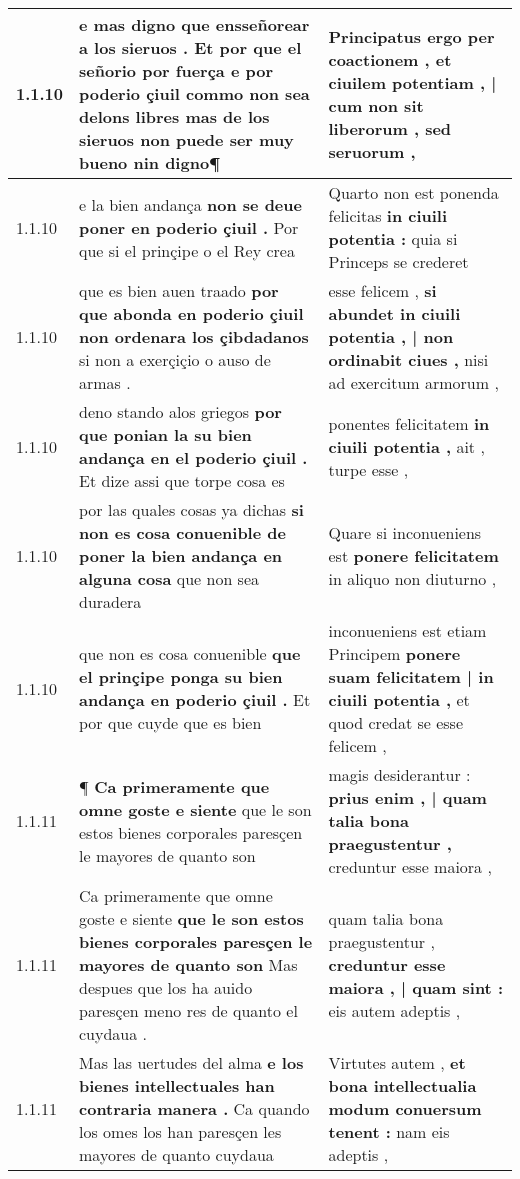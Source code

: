 \begin{tabular}{|p{1cm}|p{6.5cm}|p{6.5cm}|}
1.1.10 & e mas digno que ensseñorear a los sieruos . \textbf{ Et por que el señorio por fuerça e por poderio çiuil commo non sea delons libres } mas de los sieruos non puede ser muy bueno nin digno¶ & Principatus ergo per coactionem , \textbf{ et ciuilem potentiam , | cum non sit liberorum , } sed seruorum , \\\hline
1.1.10 & e la bien andança \textbf{ non se deue poner en poderio çiuil . } Por que si el prinçipe o el Rey crea & Quarto non est ponenda felicitas \textbf{ in ciuili potentia : } quia si Princeps se crederet \\\hline
1.1.10 & que es bien auen traado \textbf{ por que abonda en poderio çiuil non ordenara los çibdadanos } si non a exerçiçio o auso de armas . & esse felicem , \textbf{ si abundet in ciuili potentia , | non ordinabit ciues , } nisi ad exercitum armorum , \\\hline
1.1.10 & deno stando alos griegos \textbf{ por que ponian la su bien andança en el poderio çiuil . } Et dize assi que torpe cosa es & ponentes felicitatem \textbf{ in ciuili potentia , } ait , turpe esse , \\\hline
1.1.10 & por las quales cosas ya dichas \textbf{ si non es cosa conuenible de poner la bien andança en alguna cosa } que non sea duradera & Quare si inconueniens est \textbf{ ponere felicitatem } in aliquo non diuturno , \\\hline
1.1.10 & que non es cosa conuenible \textbf{ que el prinçipe ponga su bien andança en poderio çiuil . } Et por que cuyde que es bien & inconueniens est etiam Principem \textbf{ ponere suam felicitatem | in ciuili potentia , } et quod credat se esse felicem , \\\hline
1.1.11 & ¶ \textbf{ Ca primeramente que omne goste e siente } que le son estos bienes corporales paresçen le mayores de quanto son & magis desiderantur : \textbf{ prius enim , | quam talia bona praegustentur , } creduntur esse maiora , \\\hline
1.1.11 & Ca primeramente que omne goste e siente \textbf{ que le son estos bienes corporales paresçen le mayores de quanto son } Mas despues que los ha auido paresçen meno res de quanto el cuydaua . & quam talia bona praegustentur , \textbf{ creduntur esse maiora , | quam sint : } eis autem adeptis , \\\hline
1.1.11 & Mas las uertudes del alma \textbf{ e los bienes intellectuales han contraria manera . } Ca quando los omes los han paresçen les mayores de quanto cuydaua & Virtutes autem , \textbf{ et bona intellectualia modum conuersum tenent : } nam eis adeptis , \\\hline

\end{tabular}
